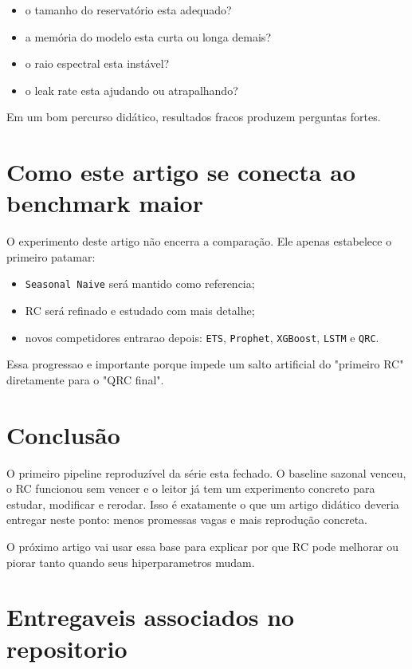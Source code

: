 \documentclass[12pt]{article}
\providecommand{\tightlist}{%
              \setlength{\itemsep}{0pt}\setlength{\parskip}{0pt}}
\begin{document}
\begin{itemize}
\tightlist
\item
  o tamanho do reservatório esta adequado?
\item
  a memória do modelo esta curta ou longa demais?
\item
  o raio espectral esta instável?
\item
  o leak rate esta ajudando ou atrapalhando?
\end{itemize}

Em um bom percurso didático, resultados fracos produzem perguntas fortes.

\section{Como este artigo se conecta ao benchmark maior}\label{9-como-este-artigo-se-conecta-ao-benchmark-maior}

O experimento deste artigo não encerra a comparação. Ele apenas estabelece o primeiro patamar:

\begin{itemize}
\tightlist
\item
  \texttt{Seasonal\ Naive} será mantido como referencia;
\item
  RC será refinado e estudado com mais detalhe;
\item
  novos competidores entrarao depois: \texttt{ETS}, \texttt{Prophet}, \texttt{XGBoost}, \texttt{LSTM} e \texttt{QRC}.
\end{itemize}

Essa progressao e importante porque impede um salto artificial do "primeiro RC" diretamente para o "QRC final".

\section{Conclusão}\label{10-conclusuxe3o}

O primeiro pipeline reproduzível da série esta fechado. O baseline sazonal venceu, o RC funcionou sem vencer e o leitor já tem um experimento concreto para estudar, modificar e rerodar. Isso é exatamente o que um artigo didático deveria entregar neste ponto: menos promessas vagas e mais reprodução concreta.

O próximo artigo vai usar essa base para explicar por que RC pode melhorar ou piorar tanto quando seus hiperparametros mudam.

\section*{Entregaveis associados no repositorio}\label{entregaveis-associados-no-repositorio}
\end{document}
